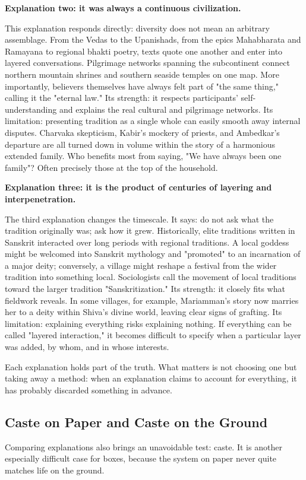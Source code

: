 \textbf{Explanation two: it was always a continuous civilization.}

This explanation responds directly: diversity does not mean an arbitrary assemblage. From the Vedas to the Upanishads, from the epics Mahabharata and Ramayana to regional bhakti poetry, texts quote one another and enter into layered conversations. Pilgrimage networks spanning the subcontinent connect northern mountain shrines and southern seaside temples on one map. More importantly, believers themselves have always felt part of "the same thing," calling it the "eternal law." Its strength: it respects participants' self-understanding and explains the real cultural and pilgrimage networks. Its limitation: presenting tradition as a single whole can easily smooth away internal disputes. Charvaka skepticism, Kabir's mockery of priests, and Ambedkar's departure are all turned down in volume within the story of a harmonious extended family. Who benefits most from saying, "We have always been one family"? Often precisely those at the top of the household.

\textbf{Explanation three: it is the product of centuries of layering and interpenetration.}

The third explanation changes the timescale. It says: do not ask what the tradition originally was; ask how it grew. Historically, elite traditions written in Sanskrit interacted over long periods with regional traditions. A local goddess might be welcomed into Sanskrit mythology and "promoted" to an incarnation of a major deity; conversely, a village might reshape a festival from the wider tradition into something local. Sociologists call the movement of local traditions toward the larger tradition "Sanskritization." Its strength: it closely fits what fieldwork reveals. In some villages, for example, Mariamman's story now marries her to a deity within Shiva's divine world, leaving clear signs of grafting. Its limitation: explaining everything risks explaining nothing. If everything can be called "layered interaction," it becomes difficult to specify when a particular layer was added, by whom, and in whose interests.

Each explanation holds part of the truth. What matters is not choosing one but taking away a method: when an explanation claims to account for everything, it has probably discarded something in advance.

\subsection{Caste on Paper and Caste on the Ground}
Comparing explanations also brings an unavoidable test: caste. It is another especially difficult case for boxes, because the system on paper never quite matches life on the ground.

